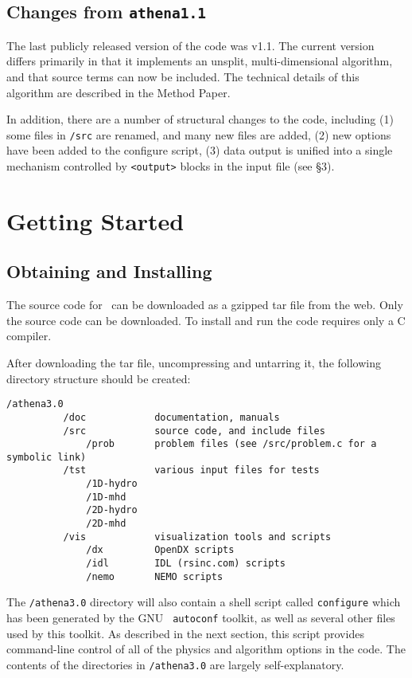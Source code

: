 \subsection{Changes from {\tt athena1.1}}

The last publicly released version of the code was v1.1.  The current version
differs primarily in that it implements an unsplit, 
multi-dimensional algorithm, and that source terms can now be included.
The technical details of this algorithm
are described in the Method Paper.

In addition, there are a number of structural changes to the code, including
(1) some files in {\tt /src} are renamed, and many new files are added,
(2) new options have been added to the configure script,
(3) data output is unified into a single mechanism controlled by {\tt <output>}
blocks in the input file (see \S 3). 

\section{Getting Started}

\subsection{Obtaining and Installing \ath}

The source code for \ath\ can be downloaded as a gzipped tar file from the
web.  Only the source code can be downloaded.  To install and run the code
requires only a C compiler.

After downloading the tar file, uncompressing and untarring it,
the following directory structure should be created:

\footnotesize
\begin{verbatim}
/athena3.0
          /doc            documentation, manuals
          /src            source code, and include files
              /prob       problem files (see /src/problem.c for a symbolic link)
          /tst            various input files for tests
              /1D-hydro
              /1D-mhd
              /2D-hydro
              /2D-mhd
          /vis            visualization tools and scripts
              /dx         OpenDX scripts
              /idl        IDL (rsinc.com) scripts
              /nemo       NEMO scripts
\end{verbatim}
\normalsize

The {\tt /athena3.0} directory will also contain a shell script
called {\tt configure} which has been generated by the GNU {\tt
autoconf} toolkit, as well as several other files used by this
toolkit.  As described in the next section, this script provides command-line
control of all of the physics and algorithm options in the code.
The contents of the directories in {\tt /athena3.0} are largely
self-explanatory.

